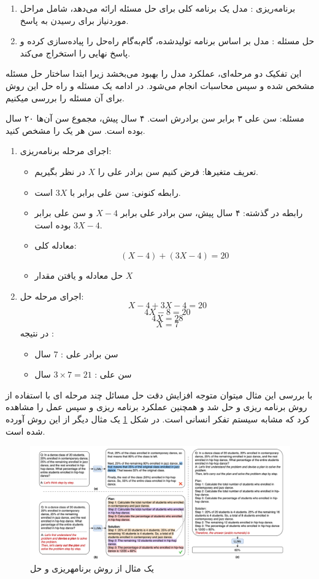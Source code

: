 \begin{enumerate}
	\item برنامه‌ریزی 
	:
	مدل یک برنامه کلی برای حل مسئله ارائه می‌دهد، شامل مراحل موردنیاز برای رسیدن به پاسخ.  
	\item حل مسئله
	:
	مدل بر اساس برنامه تولیدشده، گام‌به‌گام راه‌حل را پیاده‌سازی کرده و پاسخ نهایی را استخراج می‌کند.  
\end{enumerate}  

این تفکیک دو مرحله‌ای، عملکرد مدل را بهبود می‌بخشد زیرا ابتدا ساختار حل مسئله مشخص شده و سپس محاسبات انجام می‌شود.  
در ادامه یک مسئله و راه حل این روش برای آن مسئله را بررسی می\/کنیم.

مسئله:	سن علی ۳ برابر سن برادرش است. ۴ سال پیش، مجموع سن آن‌ها ۲۰ سال بوده است. سن هر یک را مشخص کنید. 

\begin{enumerate}
	\item اجرای مرحله برنامه‌ریزی:
	\begin{itemize}
		\item تعریف متغیرها: فرض کنیم سن برادر علی را $X$ در نظر بگیریم.  
		\item رابطه کنونی: سن علی برابر با $3X$ است.  
		\item رابطه در گذشته: ۴ سال پیش، سن برادر علی برابر $X-4$ و سن علی برابر $3X-4$ بوده است.  
		\item معادله کلی:  
		\[
		(X - 4) + (3X - 4) = 20
		\]
		\item حل معادله و یافتن مقدار $X$
	\end{itemize} 
	
	\item اجرای مرحله حل:
	\[
	X - 4 + 3X - 4 = 20
	\]  
	\[
	4X - 8 = 20
	\]  
	\[
	4X = 28
	\]  
	\[
	X = 7
	\]  
	در نتیجه :  
	\begin{itemize}
		\item سن برادر علی : $7$ سال  
		\item سن علی : $3 \times 7 = 21$ سال  
	\end{itemize}  
\end{enumerate}

با بررسی این مثال می\/توان متوجه افزایش دقت حل مسائل چند مرحله ای با استفاده از روش برنامه ریزی و حل شد و همچنین عملکرد برنامه ریزی و سپس عمل را مشاهده کرد که مشابه سیستم تفکر انسانی است.
در شکل \ref{fig_ps} یک مثال دیگر از این روش آورده شده است.

\begin{figure}[!t]
	\centering
	\includegraphics[width=160mm]{images/ps}
	\caption{یک مثال از روش برنامه\/ریزی و حل}
	\label{fig_ps}
\end{figure}


